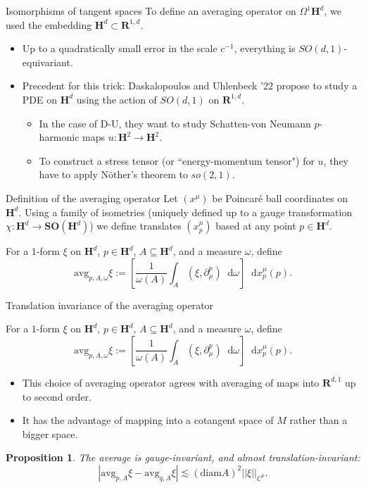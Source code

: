 \documentclass[10pt]{beamer}
\newcommand{\RR}{\mathbf{R}}
\newcommand{\Hyp}{\mathbf H}
\newcommand{\SpOrth}{\mathbf{SO}}
\newcommand*\dif{\mathop{}\!\mathrm{d}}
\newcommand{\avg}{\mathrm{avg}}
\newtheorem{proposition}{Proposition}
\begin{document}
\begin{frame}{Isomorphisms of tangent spaces}
To define an averaging operator on $\Omega^1\Hyp^d$, we used the embedding $\Hyp^d \subset \RR^{1, d}$.\pause
\begin{itemize}
\item Up to a quadratically small error in the scale $c^{-1}$, everything is $SO(d, 1)$-equivariant.\pause
\item Precedent for this trick: Daskalopoulos and Uhlenbeck '22 propose to study a PDE on $\Hyp^d$ using the action of $SO(d, 1)$ on $\RR^{1, d}$.\pause
\begin{itemize}
\item In the case of D-U, they want to study Schatten-von Neumann $p$-harmonic maps $u: \Hyp^2 \to \Hyp^2$.\pause
\item To construct a stress tensor (or ``energy-momentum tensor") for $u$, they have to apply N\"other's theorem to $so(2, 1)$.
\end{itemize}
\end{itemize}
\end{frame}

\begin{frame}{Definition of the averaging operator}
Let $(x^\mu)$ be Poincar\'e ball coordinates on $\Hyp^d$.
Using a family of isometries (uniquely defined up to a gauge transformation $\chi: \Hyp^d \to \SpOrth(\Hyp^d)$) we define translates $(x^\mu_p)$ based at any point $p \in \Hyp^d$.\pause

\begin{definition}
For a $1$-form $\xi$ on $\Hyp^d$, $p \in \Hyp^d$, $A \subseteq \Hyp^d$, and a measure $\omega$, define
$$\avg_{p, A, \omega} \xi := \left[\frac{1}{\omega(A)} \int_A (\xi, \partial_\mu^p) \dif \omega\right] \dif x^\mu_p(p).$$
\end{definition}
\end{frame}

\begin{frame}{Translation invariance of the averaging operator}
\begin{definition}
For a $1$-form $\xi$ on $\Hyp^d$, $p \in \Hyp^d$, $A \subseteq \Hyp^d$, and a measure $\omega$, define
$$\avg_{p, A, \omega} \xi := \left[\frac{1}{\omega(A)} \int_A (\xi, \partial_\mu^p) \dif \omega\right] \dif x^\mu_p(p).$$
\end{definition}\pause

\begin{itemize}
\item This choice of averaging operator agrees with averaging of maps into $\RR^{d, 1}$ up to second order.\pause
\item It has the advantage of mapping into a cotangent space of $M$ rather than a bigger space.\pause
\end{itemize}

\begin{proposition}
The average is gauge-invariant, and almost translation-invariant:
$$|\avg_{p, A} \xi - \avg_{q, A} \xi| \lesssim (\mathrm{diam} A)^2 ||\xi||_{C^0}.$$
\end{proposition} 
\end{frame}
\end{document}

